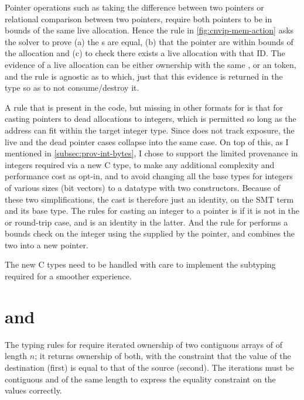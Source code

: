 Pointer operations such as taking the difference between two pointers or
relational comparison between two pointers, require both pointers to be in
bounds of the same live allocation. Hence the rule in \cref{fig:cnvip-mem-action}
asks the solver to prove (a) the s are equal, (b) that the
pointer are within bounds of the allocation and (c) to check there exists a
live allocation with that ID\@. The evidence of a live allocation can be
either ownership with the same , or an  token,
and the rule is agnostic as to which, just that this evidence is returned
in the type so as to not consume/destroy it.

A rule that is present in the code, but missing in other formats for
 is that for casting pointers to dead allocations to integers,
which is permitted so long as the address can fit within the target integer
type. Since  does not track exposure, the live and the dead
pointer cases collapse into the same case. On top of this, as I mentioned in
\cref{subsec:prov-int-bytes}, I chose to support the limited provenance in
integers required via a new C type, to make any additional complexity and
performance cost as opt-in, and to avoid changing all the base types for
integers of various sizes (bit vectors) to a datatype with two constructors.
Because of these two simplifications, the cast is therefore just an identity,
on the SMT term and its base type. The rules for
casting an integer to a pointer is  if it is not in the 
or round-trip case, and is an identity in the latter. And the rule for  performs a bounds check on
the integer using the  supplied by the pointer, and combines the
two into a new pointer.

The new C types need to be handled with care to implement the subtyping
required for a smoother experience.

\section{ and }

The typing rules for  require iterated ownership of two
contiguous arrays of  of length $n$; it returns ownership of
both, with the constraint that the value of the destination (first) is equal to
that of the source (second). The iterations must be contiguous and of the same
length to express the equality constraint on the values correctly.


